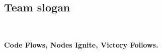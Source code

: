 \vspace{4em}


















\subsection{Team slogan}
\ 

\textbf{Code Flows, Nodes Ignite, Victory Follows.}

\clearpage
